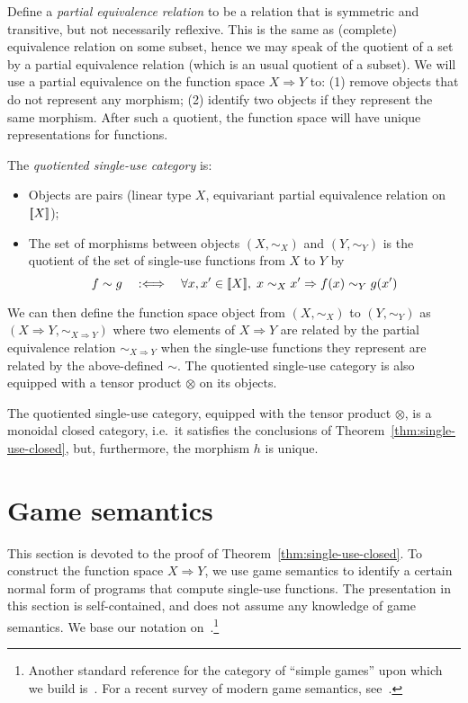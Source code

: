 \documentclass[a4paper,UKenglish,cleveref, autoref, numberwithinsect, thm-restate]{lipics-v2021}
\begin{document}
Define a \emph{partial equivalence relation} to be a relation that is symmetric and transitive, but not necessarily reflexive.  This is the same as (complete) equivalence relation on some subset, hence we may speak of the quotient of a set by a partial equivalence relation (which is an usual quotient of a subset). We will use a partial equivalence on the function space $X \Rightarrow Y$ to: (1)
 remove objects that do not represent any morphism; (2) identify two objects if they represent the same morphism. After such a quotient, the function space will have unique representations for functions. 

\begin{definition}
    The \emph{quotiented single-use category} is: 
    \begin{itemize}
    \item Objects are pairs (linear type $X$, equivariant partial equivalence relation on $[{\kern-0.45ex}[X]{\kern-0.45ex}]$);
    \item The set of morphisms between objects $(X,\sim_X)$ and $(Y,\sim_Y)$ is the quotient of the set of single-use functions from $X$ to $Y$ by
    \[ f \sim g \quad:\Longleftrightarrow\quad  \forall x,x' \in [{\kern-0.45ex}[X]{\kern-0.45ex}], \; x \sim_X x' \Rightarrow f(x) \sim_Y g(x') \]
    \end{itemize}
\end{definition}
We can then define the function space object from $(X,\sim_X)$ to $(Y,\sim_Y)$ as $(X\Rightarrow Y, \sim_{X\Rightarrow Y})$ where two elements of $X\Rightarrow Y$ are related by the partial equivalence relation $\sim_{X\Rightarrow Y}$ when the single-use functions they represent are related by the above-defined $\sim$. The quotiented single-use category is also equipped with a tensor product $\otimes$ on its objects.
\begin{theorem}\label{thm:quotient-closed}
    The quotiented single-use category, equipped with the tensor product $\otimes$, is a monoidal closed category, i.e.~it satisfies the conclusions of Theorem~\ref{thm:single-use-closed}, but, furthermore, the morphism $h$ is unique.
\end{theorem}

\newcommand{\invar}[1]{#1_{\mathrm{in}}}
\newcommand{\outvar}[1]{#1_{\mathrm{out}}}

\section{Game semantics}
\label{sec:game-semantics}

This section is devoted to the proof of Theorem~\ref{thm:single-use-closed}. To construct the function space $X \Rightarrow Y$, we use game semantics to identify a certain normal form of programs that compute single-use functions. The presentation in this section is self-contained, and does not assume any knowledge of game semantics. We base our notation on~\cite{abramsky2013semantics}.\footnote{Another standard reference for the category of ``simple games'' upon which we build is~\cite{Hyland1997}. For a recent survey of modern game semantics, see~\cite{ClairambaultHDR}.}
\end{document}
